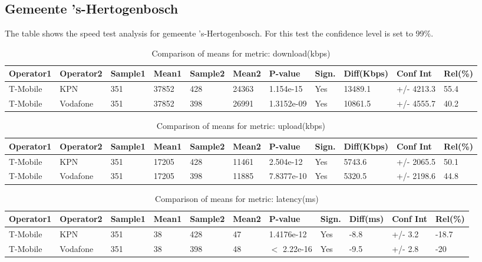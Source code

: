 \documentclass[]{article}
\begin{document}
\normalsize

\newpage

\subsection{Gemeente 's-Hertogenbosch}\label{gemeente-s-hertogenbosch}

The table shows the speed test analysis for gemeente 's-Hertogenbosch.
For this test the confidence level is set to 99\%.

\begin{table}[ht]
\centering
{\footnotesize
\begin{tabular}{lllllllllll}
  \hline
Operator1 & Operator2 & Sample1 & Mean1 & Sample2 & Mean2 & P-value & Sign. & Diff(Kbps) & Conf Int & Rel(\%) \\ 
  \hline
T-Mobile & KPN & 351 & 37852 & 428 & 24363 & 1.154e-15 & Yes & 13489.1 & +/- 4213.3 & 55.4 \\ 
  T-Mobile & Vodafone & 351 & 37852 & 398 & 26991 & 1.3152e-09 & Yes & 10861.5 & +/- 4555.7 & 40.2 \\ 
   \hline
\end{tabular}
}
\caption{Comparison of means for metric: download(kbps)} 
\end{table}

\begin{table}[ht]
\centering
{\footnotesize
\begin{tabular}{lllllllllll}
  \hline
Operator1 & Operator2 & Sample1 & Mean1 & Sample2 & Mean2 & P-value & Sign. & Diff(Kbps) & Conf Int & Rel(\%) \\ 
  \hline
T-Mobile & KPN & 351 & 17205 & 428 & 11461 & 2.504e-12 & Yes & 5743.6 & +/- 2065.5 & 50.1 \\ 
  T-Mobile & Vodafone & 351 & 17205 & 398 & 11885 & 7.8377e-10 & Yes & 5320.5 & +/- 2198.6 & 44.8 \\ 
   \hline
\end{tabular}
}
\caption{Comparison of means for metric: upload(kbps)} 
\end{table}

\begin{table}[ht]
\centering
{\footnotesize
\begin{tabular}{lllllllllll}
  \hline
Operator1 & Operator2 & Sample1 & Mean1 & Sample2 & Mean2 & P-value & Sign. & Diff(ms) & Conf Int & Rel(\%) \\ 
  \hline
T-Mobile & KPN & 351 & 38 & 428 & 47 & 1.4176e-12 & Yes & -8.8 & +/- 3.2 & -18.7 \\ 
  T-Mobile & Vodafone & 351 & 38 & 398 & 48 & $<$ 2.22e-16 & Yes & -9.5 & +/- 2.8 & -20 \\ 
   \hline
\end{tabular}
}
\caption{Comparison of means for metric: latency(ms)} 
\end{table}
\end{document}
